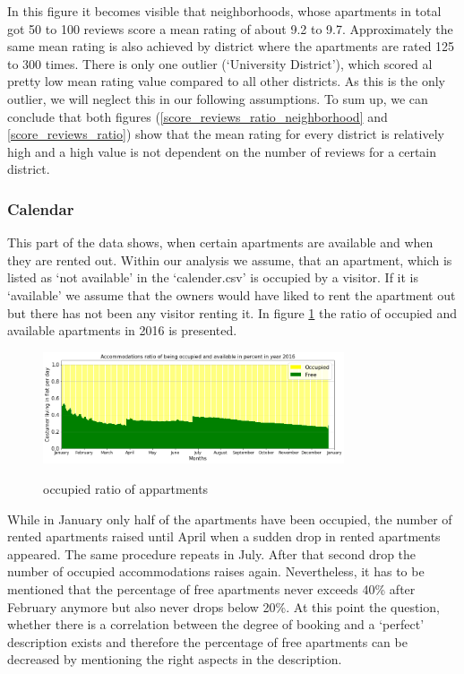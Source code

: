 %
In this figure it becomes visible that neighborhoods, whose apartments in total got 50 to 100 reviews score a mean rating of about 9.2 to 9.7. Approximately the same mean rating is also achieved by district where the apartments are rated 125 to 300 times. There is only one outlier (‘University District’), which scored al pretty low mean rating value compared to all other districts. As this is the only outlier, we will neglect this in our following assumptions.
To sum up, we can conclude that both figures (\ref{score_reviews_ratio_neighborhood} and \ref{score_reviews_ratio}) show that the mean rating for every district is relatively high and a high value is not dependent on the number of reviews for a certain district.
\subsubsection{Calendar}
This part of the data shows, when certain apartments are available and when they are rented out. Within our analysis we assume, that an apartment, which is listed as ‘not available’ in the ‘calender.csv’ is occupied by a visitor. If it is ‘available’ we assume that the owners would have liked to rent the apartment out but there has not been any visitor renting it. In figure \ref{occupied_ratio_appartments} the ratio of occupied and available apartments in 2016 is presented.
%
\begin{figure}
  \begin{center}
  \includegraphics[width=3.5in]{photo/11_acc_ratio_occupied.png}\\
  \caption{occupied ratio of appartments}\label{occupied_ratio_appartments}
  \end{center}
\end{figure}
%
While in January only half of the apartments have been occupied, the number of rented apartments raised until April when a sudden drop in rented apartments appeared. The same procedure repeats in July. After that second drop the number of occupied accommodations raises again. Nevertheless, it has to be mentioned that the percentage of free apartments never exceeds 40\% after February anymore but also never drops below 20\%. At this point the question, whether there is a correlation between the degree of booking and a ‘perfect’ description exists and therefore the percentage of free apartments can be decreased by mentioning the right aspects in the description. 

